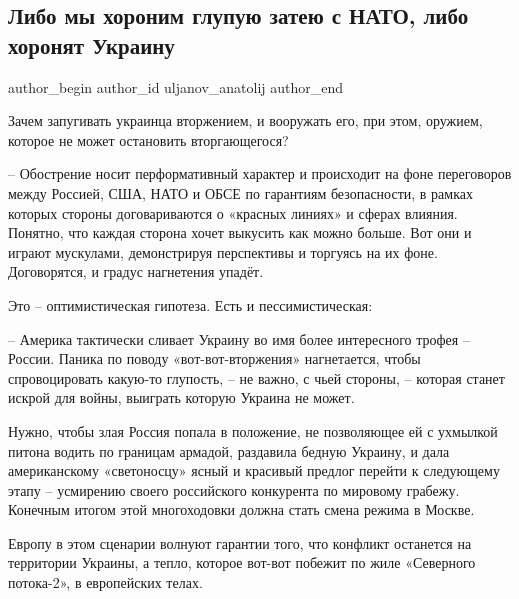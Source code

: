  
 
 
 
 
 
\subsection{Либо мы хороним глупую затею с НАТО, либо хоронят Украину}
\label{sec:22_01_2022.fb.uljanov_anatolij.1.nato_zateja_horonit}
 
\ifcmt
 author_begin
   author_id uljanov_anatolij
 author_end
\fi

Зачем запугивать украинца вторжением, и вооружать его, при этом, оружием,
которое не может остановить вторгающегося?


– Обострение носит перформативный характер и происходит на фоне переговоров
между Россией, США, НАТО и ОБСЕ по гарантиям безопасности, в рамках которых
стороны договариваются о «красных линиях» и сферах влияния. Понятно, что каждая
сторона хочет выкусить как можно больше. Вот они и играют мускулами,
демонстрируя перспективы и торгуясь на их фоне. Договорятся, и градус
нагнетения упадёт.

Это – оптимистическая гипотеза. Есть и пессимистическая:  

– Америка тактически сливает Украину во имя более интересного трофея – России.
Паника по поводу «вот-вот-вторжения» нагнетается, чтобы спровоцировать какую-то
глупость, – не важно, с чьей стороны, – которая станет искрой для войны,
выиграть которую Украина не может. 

Нужно, чтобы злая Россия попала в положение, не позволяющее ей с ухмылкой
питона водить по границам армадой, раздавила бедную Украину, и дала
американскому «светоносцу» ясный и красивый предлог перейти к следующему этапу
– усмирению своего российского конкурента по мировому грабежу. Конечным итогом
этой многоходовки должна стать смена режима в Москве.

Европу в этом сценарии волнуют гарантии того, что конфликт останется на
территории Украины, а тепло, которое вот-вот побежит по жиле «Северного
потока-2», в европейских телах.

